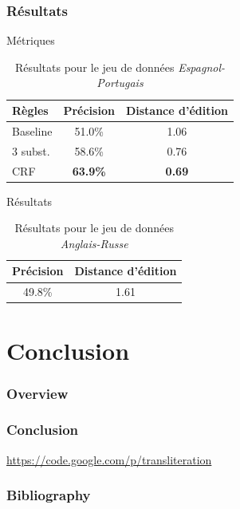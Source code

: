 \documentclass{beamer}
\begin{document}
\begin{frame}
\frametitle{Résultats}
\begin{block}{Métriques}
\begin{center}
\begin{table}[H]
\caption{Résultats pour le jeu de données \emph{Espagnol-Portugais} }
\begin{tabular}{|l|c|c|}
\hline
Règles&Précision&Distance d'édition\\
\hline
Baseline&51.0\%&1.06\\
\hline
3 subst.&58.6\%&0.76\\
\hline
CRF&\textbf{63.9\%}&\textbf{0.69}\\
\hline
\end{tabular}
\end{table}
\end{center}
\end{block}

\begin{block}{Résultats}
\begin{center}
\begin{table}[H]
\caption{Résultats pour le jeu de données \emph{Anglais-Russe} }
\begin{center}
\begin{tabular}{|c|c|}
\hline
Précision&Distance d'édition\\
\hline
49.8\%&1.61\\
\hline
\end{tabular}
\end{center}
\end{table}
\end{center}
\end{block}

\end{frame}


\section{Conclusion}


\begin{frame}
    \frametitle{Overview}
\end{frame}

\begin{frame}
    \frametitle{Conclusion}
    \url{https://code.google.com/p/transliteration}
\end{frame}


\begin{frame}
    \frametitle{Bibliography}
    {\fontsize{0.8em}{1em}
    \nocite{*}
    
    }
\end{frame}
\end{document}
